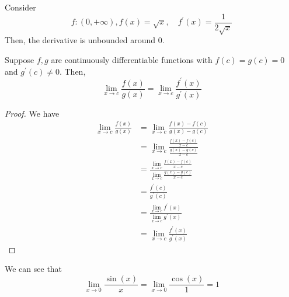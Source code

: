   \begin{example}
    \label{ex:differentiable-but-not-lipschitz}
    Consider 
    \begin{equation}
      f: (0, +\infty), f(x) = \sqrt{x}, \quad f^\prime (x) = \frac{1}{2 \sqrt{x}}
    \end{equation}
    Then, the derivative is unbounded around $0$. 
  \end{example}

  \begin{theorem}
    \label{thm:lhopital}
    Suppose $f, g$ are continuously differentiable functions with $f(c) = g(c) = 0$ and $g^\prime (c) \neq 0$. Then, 
    \begin{equation}
      \lim_{x \to c} \frac{f(x)}{g(x)} = \lim_{x \to c} \frac{f^\prime (x)}{g^\prime (x)}
    \end{equation}
  \end{theorem}
  \begin{proof}
    We have 
    \begin{align}
      \lim_{x \to c} \frac{f(x)}{g(x)} 
			& = \lim_{x \to c} \frac{f(x) - f(c)}{g(x) - g(c)} \\ 
			& = \lim_{x \to c} \frac{\frac{f(x) - f(c)}{x -  c}}{\frac{g(x) - g(c)}{x - c}} \\ 
			& = \frac{\lim_{x \to c} \frac{f(x) - f(c)}{x - c}}{\lim_{x \to c} \frac{g(x) - g(c)}{x - c}} \\ 
			& = \frac{f^\prime (c)}{g^\prime (c)} \\ 
			& = \frac{\lim_{x \to c} f^\prime (x)}{\lim_{x \to c} g^\prime (x)} \\ 
			& = \lim_{x \to c} \frac{f^\prime (x)}{g^\prime (x)}
    \end{align}
  \end{proof}

  \begin{example}
    \label{ex:limit-of-sinxx}
    We can see that 
    \begin{equation}
      \lim_{x \to 0} \frac{\sin(x)}{x} = \lim_{x \to 0} \frac{\cos(x)}{1} = 1
    \end{equation}
  \end{example}

